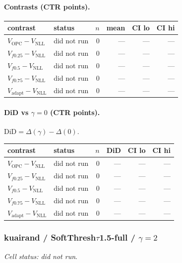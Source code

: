 \documentclass[10pt,a4paper]{article}
\begin{document}
\paragraph{Contrasts (CTR points).}
{\centering\small\begin{tabular}{llrrrr}
\toprule contrast & status & $n$ & mean & CI lo & CI hi \\
\midrule
$V_{\mathrm{OPC}}-V_{\mathrm{NLL}}$ & did not run & 0 & --- & --- & --- \\
$V_{f0.25}-V_{\mathrm{NLL}}$ & did not run & 0 & --- & --- & --- \\
$V_{f0.5}-V_{\mathrm{NLL}}$ & did not run & 0 & --- & --- & --- \\
$V_{f0.75}-V_{\mathrm{NLL}}$ & did not run & 0 & --- & --- & --- \\
$V_{\mathrm{adapt}}-V_{\mathrm{NLL}}$ & did not run & 0 & --- & --- & --- \\
\bottomrule\end{tabular}\par}
\paragraph{DiD vs $\gamma=0$ (CTR points).} $\mathrm{DiD}=\Delta(\gamma)-\Delta(0)$.
{\centering\small\begin{tabular}{llrrrr}
\toprule contrast & status & $n$ & DiD & CI lo & CI hi \\
\midrule
$V_{\mathrm{OPC}}-V_{\mathrm{NLL}}$ & did not run & 0 & --- & --- & --- \\
$V_{f0.25}-V_{\mathrm{NLL}}$ & did not run & 0 & --- & --- & --- \\
$V_{f0.5}-V_{\mathrm{NLL}}$ & did not run & 0 & --- & --- & --- \\
$V_{f0.75}-V_{\mathrm{NLL}}$ & did not run & 0 & --- & --- & --- \\
$V_{\mathrm{adapt}}-V_{\mathrm{NLL}}$ & did not run & 0 & --- & --- & --- \\
\bottomrule\end{tabular}\par}
\bigskip
\subsubsection{kuairand / SoftThresh$\tau$1.5-full / $\gamma=2$}
\emph{Cell status: did not run}.
\end{document}
